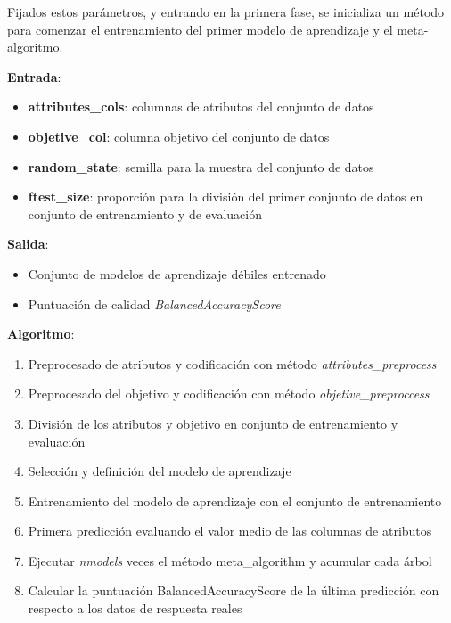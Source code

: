 \documentclass[conference,a4paper]{IEEEtran}
\begin{document}
Fijados estos parámetros, y entrando en la primera fase, se inicializa un método para comenzar el entrenamiento del primer modelo de aprendizaje y el meta-algoritmo. \\

\begin{textb}

    \textbf{Entrada}:
    \begin{itemize}
    \item \textbf{attributes\_cols}: columnas de atributos del conjunto de datos
    \item \textbf{objetive\_col}: columna objetivo del conjunto de datos
    \item \textbf{random\_state}: semilla para la muestra del conjunto de datos
    \item \textbf{ftest\_size}: proporción para la división del primer conjunto de datos en conjunto de entrenamiento y de evaluación
\end{itemize}
\textbf{Salida}:
\begin{itemize}
    \item Conjunto de modelos de aprendizaje débiles entrenado
    \item Puntuación de calidad \textit{BalancedAccuracyScore}
\end{itemize}
\textbf{Algoritmo}:
\begin{enumerate}
    \item Preprocesado de atributos y codificación con método \textit{attributes\_preprocess}
    \item Preprocesado del objetivo y codificación con método \textit{objetive\_preproccess}
    \item División de los atributos y objetivo en conjunto de entrenamiento y evaluación
    \item Selección y definición del modelo de aprendizaje
    \item Entrenamiento del modelo de aprendizaje con el conjunto de entrenamiento
    \item Primera predicción evaluando el valor medio de las columnas de atributos
    \item Ejecutar \textit{nmodels} veces el método meta\_algorithm y acumular cada árbol
    \item Calcular la puntuación BalancedAccuracyScore de la última predicción con respecto a los datos de respuesta reales
\end{enumerate}
\end{textb}
\end{document}

